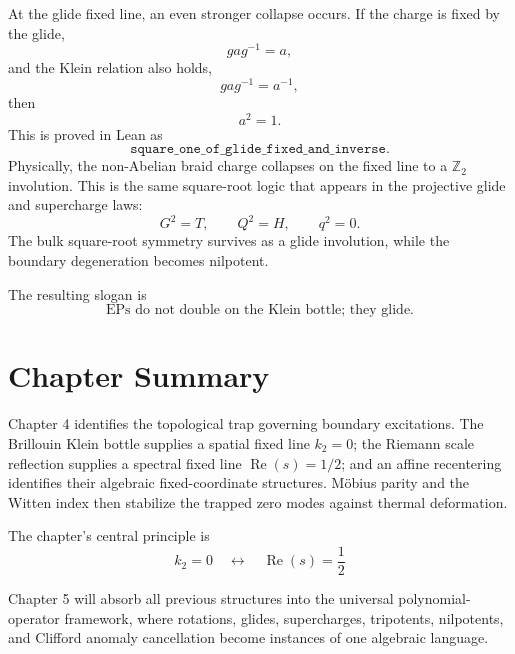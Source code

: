 At the glide fixed line, an even stronger collapse occurs.  If the charge is fixed by the glide,
\begin{equation}
    gag^{-1}=a,
\end{equation}
and the Klein relation also holds,
\begin{equation}
    gag^{-1}=a^{-1},
\end{equation}
then
\begin{equation}
    a^2=1.
\end{equation}
This is proved in Lean as
\begin{equation}
    \texttt{square\_one\_of\_glide\_fixed\_and\_inverse}.
\end{equation}
Physically, the non-Abelian braid charge collapses on the fixed line to a $\mathbb{Z}_2$ involution.  This is the same square-root logic that appears in the projective glide and supercharge laws:
\begin{equation}
    G^2=T,
    \qquad
    Q^2=H,
    \qquad
    q^2=0.
\end{equation}
The bulk square-root symmetry survives as a glide involution, while the boundary degeneration becomes nilpotent.

The resulting slogan is
\begin{equation}
    \boxed{
    \text{EPs do not double on the Klein bottle; they glide.}
    }
\end{equation}

\section{Chapter Summary}

Chapter 4 identifies the topological trap governing boundary excitations.  The Brillouin Klein bottle supplies a spatial fixed line $k_2=0$; the Riemann scale reflection supplies a spectral fixed line $\operatorname{Re}(s)=1/2$; and an affine recentering identifies their algebraic fixed-coordinate structures.  Möbius parity and the Witten index then stabilize the trapped zero modes against thermal deformation.

The chapter's central principle is
\begin{equation}
    \boxed{
    k_2=0
    \quad\longleftrightarrow\quad
    \operatorname{Re}(s)=\frac12
    }
\end{equation}

Chapter 5 will absorb all previous structures into the universal polynomial-operator framework, where rotations, glides, supercharges, tripotents, nilpotents, and Clifford anomaly cancellation become instances of one algebraic language.
